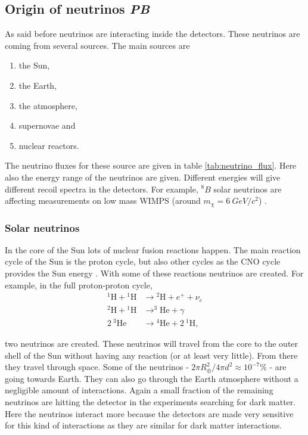 \documentclass{article}
\begin{document}
\subsection{Origin of neutrinos \small{\textit{PB}}}
As said before neutrinos are interacting inside the detectors. These neutrinos are coming from several sources. The main sources are
\begin{enumerate}
    \item the Sun,
    \item the Earth,
    \item the atmosphere,
    \item supernovae and
    \item nuclear reactors.
\end{enumerate}
The neutrino fluxes for these source are given in table \ref{tab:neutrino_flux}. Here also the energy range of the neutrinos are given. Different energies will give different recoil spectra in the detectors. For example, ${}^8B$ solar neutrinos are affecting measurements on low mass WIMPS (around $m_\chi=6\ GeV/c^2$) \cite{Billard:2013qya}.

\subsubsection{Solar neutrinos}
In the core of the Sun lots of nuclear fusion reactions happen. The main reaction cycle of the Sun is the proton cycle, but also other cycles as the CNO cycle provides the Sun energy \cite{Bonventre:2018hyd}. With some of these reactions neutrinos are created. For example, in the full proton-proton cycle,
\begin{align}
    {}^1\text{H}+{}^1\text{H}&\rightarrow {}^2\text{H}+e^++\nu_e \nonumber\\
    {}^2\text{H} + {}^1\text{H} &\rightarrow ^3\text{He}+\gamma \nonumber\\
    2\ {}^3\text{He} &\rightarrow {}^4\text{He}+2\ {}^1\text{H},
\end{align}

two neutrinos are created. These neutrinos will travel from the core to the outer shell of the Sun without having any reaction (or at least very little). From there they travel through space. Some of the neutrinos - $2\pi R_\oplus^2 / 4\pi d^2 \approx 10^{-7}\%$ - are going towards Earth. They can also go through the Earth atmosphere without a negligible amount of interactions. Again a small fraction of the remaining neutrinos are hitting the detector in the experiments searching for dark matter. Here the neutrinos interact more because the detectors are made very sensitive for this kind of interactions as they are similar for dark matter interactions.
\end{document}
